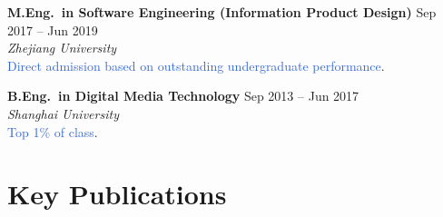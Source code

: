 \documentclass[11pt, letterpaper]{article}
\begin{document}
\vspace{12pt}

\textbf{M.Eng.\ in Software Engineering (Information Product Design)} \hfill Sep 2017 -- Jun 2019 \\
\textit{Zhejiang University} \\
\textcolor{highlight}{Direct admission based on outstanding undergraduate performance}.

\vspace{12pt}

\textbf{B.Eng.\ in Digital Media Technology} \hfill Sep 2013 -- Jun 2017 \\
\textit{Shanghai University} \\
\textcolor{highlight}{Top 1\% of class}.

\section{Key Publications}
\end{document}
